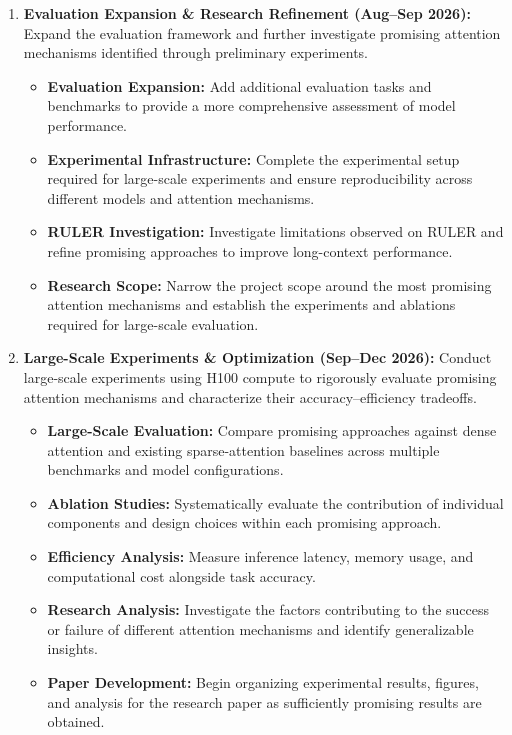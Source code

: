 \documentclass{article}
\begin{document}
\begin{enumerate}
\item \textbf{Evaluation Expansion \& Research Refinement (Aug--Sep 2026):} Expand the evaluation framework and further investigate promising attention mechanisms identified through preliminary experiments.

\begin{itemize}
    \item \textbf{Evaluation Expansion:} Add additional evaluation tasks and benchmarks to provide a more comprehensive assessment of model performance.
    \item \textbf{Experimental Infrastructure:} Complete the experimental setup required for large-scale experiments and ensure reproducibility across different models and attention mechanisms.
    \item \textbf{RULER Investigation:} Investigate limitations observed on RULER and refine promising approaches to improve long-context performance.
    \item \textbf{Research Scope:} Narrow the project scope around the most promising attention mechanisms and establish the experiments and ablations required for large-scale evaluation.
\end{itemize}

\item \textbf{Large-Scale Experiments \& Optimization (Sep--Dec 2026):} Conduct large-scale experiments using H100 compute to rigorously evaluate promising attention mechanisms and characterize their accuracy--efficiency tradeoffs.

\begin{itemize}
    \item \textbf{Large-Scale Evaluation:} Compare promising approaches against dense attention and existing sparse-attention baselines across multiple benchmarks and model configurations.
    \item \textbf{Ablation Studies:} Systematically evaluate the contribution of individual components and design choices within each promising approach.
    \item \textbf{Efficiency Analysis:} Measure inference latency, memory usage, and computational cost alongside task accuracy.
    \item \textbf{Research Analysis:} Investigate the factors contributing to the success or failure of different attention mechanisms and identify generalizable insights.
    \item \textbf{Paper Development:} Begin organizing experimental results, figures, and analysis for the research paper as sufficiently promising results are obtained.
\end{itemize}


\end{enumerate}
\end{document}
